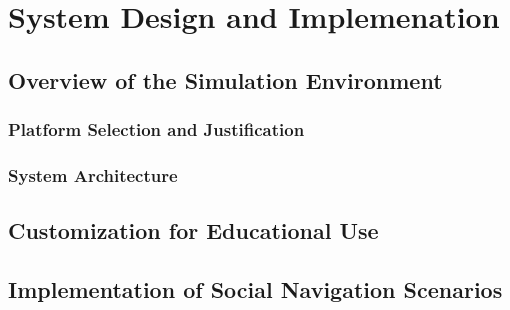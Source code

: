 
\chapter{System Design and Implemenation} %

\label{Chapter3} %


\section{Overview of the Simulation Environment}



\subsection{Platform Selection and Justification}




\subsection{System Architecture}



\section{Customization for Educational Use}





\section{Implementation of Social Navigation Scenarios}

